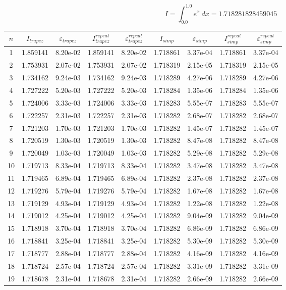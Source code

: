 \documentclass{report}[10pts]
\begin{document}
\[
   I=\int_{0.0}^{1.0}e^x~dx
   =
   1.718281828459045
\]
\begin{center}\begin{tabular}{|c|c|c|c|c|c|c|c|c|}
   \hline
   $n$ & $I_{trapez}$ & ${\varepsilon}_{trapez}$ & $I_{trapez}^{repeat}$ & ${\varepsilon}_{trapez}^{repeat}$ & $I_{simp}$ & ${\varepsilon}_{simp}$ & $I_{simp}^{repeat}$ & ${\varepsilon}_{simp}^{repeat}$\\
   \hline
   1 & 1.859141 & 8.20e-02 & 1.859141 & 8.20e-02 & 1.718861 & 3.37e-04 & 1.718861 & 3.37e-04\\
   \hline
   2 & 1.753931 & 2.07e-02 & 1.753931 & 2.07e-02 & 1.718319 & 2.15e-05 & 1.718319 & 2.15e-05\\
   \hline
   3 & 1.734162 & 9.24e-03 & 1.734162 & 9.24e-03 & 1.718289 & 4.27e-06 & 1.718289 & 4.27e-06\\
   \hline
   4 & 1.727222 & 5.20e-03 & 1.727222 & 5.20e-03 & 1.718284 & 1.35e-06 & 1.718284 & 1.35e-06\\
   \hline
   5 & 1.724006 & 3.33e-03 & 1.724006 & 3.33e-03 & 1.718283 & 5.55e-07 & 1.718283 & 5.55e-07\\
   \hline
   6 & 1.722257 & 2.31e-03 & 1.722257 & 2.31e-03 & 1.718282 & 2.68e-07 & 1.718282 & 2.68e-07\\
   \hline
   7 & 1.721203 & 1.70e-03 & 1.721203 & 1.70e-03 & 1.718282 & 1.45e-07 & 1.718282 & 1.45e-07\\
   \hline
   8 & 1.720519 & 1.30e-03 & 1.720519 & 1.30e-03 & 1.718282 & 8.47e-08 & 1.718282 & 8.47e-08\\
   \hline
   9 & 1.720049 & 1.03e-03 & 1.720049 & 1.03e-03 & 1.718282 & 5.29e-08 & 1.718282 & 5.29e-08\\
   \hline
   10 & 1.719713 & 8.33e-04 & 1.719713 & 8.33e-04 & 1.718282 & 3.47e-08 & 1.718282 & 3.47e-08\\
   \hline
   11 & 1.719465 & 6.89e-04 & 1.719465 & 6.89e-04 & 1.718282 & 2.37e-08 & 1.718282 & 2.37e-08\\
   \hline
   12 & 1.719276 & 5.79e-04 & 1.719276 & 5.79e-04 & 1.718282 & 1.67e-08 & 1.718282 & 1.67e-08\\
   \hline
   13 & 1.719129 & 4.93e-04 & 1.719129 & 4.93e-04 & 1.718282 & 1.22e-08 & 1.718282 & 1.22e-08\\
   \hline
   14 & 1.719012 & 4.25e-04 & 1.719012 & 4.25e-04 & 1.718282 & 9.04e-09 & 1.718282 & 9.04e-09\\
   \hline
   15 & 1.718918 & 3.70e-04 & 1.718918 & 3.70e-04 & 1.718282 & 6.86e-09 & 1.718282 & 6.86e-09\\
   \hline
   16 & 1.718841 & 3.25e-04 & 1.718841 & 3.25e-04 & 1.718282 & 5.30e-09 & 1.718282 & 5.30e-09\\
   \hline
   17 & 1.718777 & 2.88e-04 & 1.718777 & 2.88e-04 & 1.718282 & 4.16e-09 & 1.718282 & 4.16e-09\\
   \hline
   18 & 1.718724 & 2.57e-04 & 1.718724 & 2.57e-04 & 1.718282 & 3.31e-09 & 1.718282 & 3.31e-09\\
   \hline
   19 & 1.718678 & 2.31e-04 & 1.718678 & 2.31e-04 & 1.718282 & 2.66e-09 & 1.718282 & 2.66e-09\\
   \hline
\end{tabular}\end{center}
\end{document}
